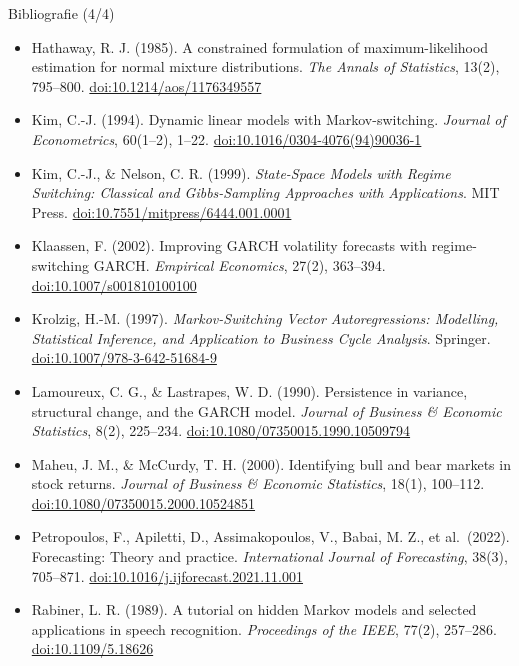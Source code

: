 \begin{frame}{Bibliografie (4/4)}
\itemsize{\tiny}
\begin{itemize}
    \item Hathaway, R. J. (1985). A constrained formulation of maximum-likelihood estimation for normal mixture distributions. \textit{The Annals of Statistics}, 13(2), 795--800. \href{https://doi.org/10.1214/aos/1176349557}{doi:10.1214/aos/1176349557}
    \item Kim, C.-J. (1994). Dynamic linear models with Markov-switching. \textit{Journal of Econometrics}, 60(1--2), 1--22. \href{https://doi.org/10.1016/0304-4076(94)90036-1}{doi:10.1016/0304-4076(94)90036-1}
    \item Kim, C.-J., \& Nelson, C. R. (1999). \textit{State-Space Models with Regime Switching: Classical and Gibbs-Sampling Approaches with Applications}. MIT Press. \href{https://doi.org/10.7551/mitpress/6444.001.0001}{doi:10.7551/mitpress/6444.001.0001}
    \item Klaassen, F. (2002). Improving GARCH volatility forecasts with regime-switching GARCH. \textit{Empirical Economics}, 27(2), 363--394. \href{https://doi.org/10.1007/s001810100100}{doi:10.1007/s001810100100}
    \item Krolzig, H.-M. (1997). \textit{Markov-Switching Vector Autoregressions: Modelling, Statistical Inference, and Application to Business Cycle Analysis}. Springer. \href{https://doi.org/10.1007/978-3-642-51684-9}{doi:10.1007/978-3-642-51684-9}
    \item Lamoureux, C. G., \& Lastrapes, W. D. (1990). Persistence in variance, structural change, and the GARCH model. \textit{Journal of Business \& Economic Statistics}, 8(2), 225--234. \href{https://doi.org/10.1080/07350015.1990.10509794}{doi:10.1080/07350015.1990.10509794}
    \item Maheu, J. M., \& McCurdy, T. H. (2000). Identifying bull and bear markets in stock returns. \textit{Journal of Business \& Economic Statistics}, 18(1), 100--112. \href{https://doi.org/10.1080/07350015.2000.10524851}{doi:10.1080/07350015.2000.10524851}
    \item Petropoulos, F., Apiletti, D., Assimakopoulos, V., Babai, M. Z., et al.\ (2022). Forecasting: Theory and practice. \textit{International Journal of Forecasting}, 38(3), 705--871. \href{https://doi.org/10.1016/j.ijforecast.2021.11.001}{doi:10.1016/j.ijforecast.2021.11.001}
    \item Rabiner, L. R. (1989). A tutorial on hidden Markov models and selected applications in speech recognition. \textit{Proceedings of the IEEE}, 77(2), 257--286. \href{https://doi.org/10.1109/5.18626}{doi:10.1109/5.18626}

\end{itemize}
\end{frame}
